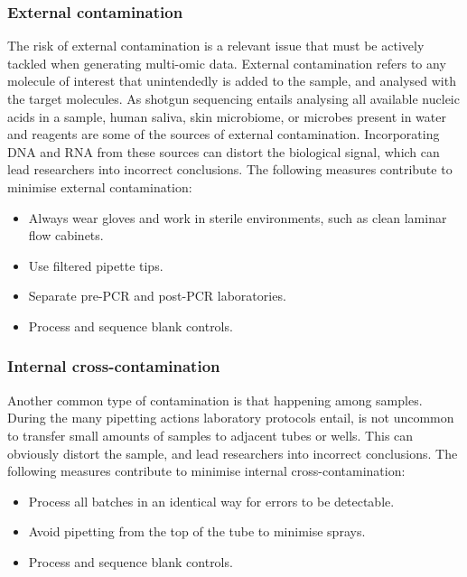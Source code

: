 \documentclass[
]{book}
\providecommand{\tightlist}{%
  \setlength{\itemsep}{0pt}\setlength{\parskip}{0pt}}
\begin{document}
\hypertarget{external-contamination}{%
\subsubsection*{External contamination}\label{external-contamination}}

The risk of external contamination is a relevant issue that must be actively tackled when generating multi-omic data. External contamination refers to any molecule of interest that unintendedly is added to the sample, and analysed with the target molecules. As shotgun sequencing entails analysing all available nucleic acids in a sample, human saliva, skin microbiome, or microbes present in water and reagents are some of the sources of external contamination. Incorporating DNA and RNA from these sources can distort the biological signal, which can lead researchers into incorrect conclusions. The following measures contribute to minimise external contamination:

\begin{itemize}
\tightlist
\item
  Always wear gloves and work in sterile environments, such as clean laminar flow cabinets.
\item
  Use filtered pipette tips.
\item
  Separate pre-PCR and post-PCR laboratories.
\item
  Process and sequence blank controls.
\end{itemize}

\hypertarget{internal-cross-contamination}{%
\subsubsection*{Internal cross-contamination}\label{internal-cross-contamination}}

Another common type of contamination is that happening among samples. During the many pipetting actions laboratory protocols entail, is not uncommon to transfer small amounts of samples to adjacent tubes or wells. This can obviously distort the sample, and lead researchers into incorrect conclusions. The following measures contribute to minimise internal cross-contamination:

\begin{itemize}
\tightlist
\item
  Process all batches in an identical way for errors to be detectable.
\item
  Avoid pipetting from the top of the tube to minimise sprays.
\item
  Process and sequence blank controls.
\end{itemize}
\end{document}

